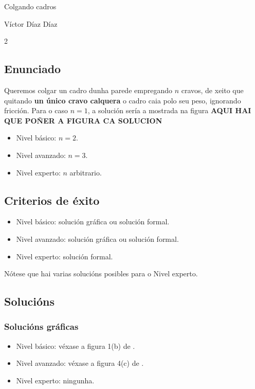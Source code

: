 Colgando cadros

Víctor Díaz Díaz

\begin{refsection}
\begin{multicols}{2}

\subsection{Enunciado}

Queremos colgar un cadro dunha parede empregando $n$ cravos, de xeito que
quitando \textbf{un único cravo calquera} o cadro caia polo seu peso, ignorando
fricción. Para o caso $n=1$, a solución sería a mostrada na figura \textbf{AQUI
HAI QUE POÑER A FIGURA CA SOLUCION}

\begin{itemize}
    \item[$\bullet$] Nivel básico: $n=2$.
    \item[$\bullet$] Nivel avanzado: $n=3$.
    \item[$\bullet$] Nivel experto: $n$ arbitrario.
\end{itemize}


\subsection{Criterios de éxito}

\begin{itemize}
    \item[$\bullet$] Nivel básico: solución gráfica ou solución formal.
    \item[$\bullet$] Nivel avanzado: solución gráfica ou solución formal.
    \item[$\bullet$] Nivel experto: solución formal.
\end{itemize}

Nótese que hai varias solucións posibles para o Nivel experto.

\subsection{Solucións}

\subsubsection{Solucións gráficas}

\begin{itemize}
    \item[$\bullet$] Nivel básico: véxase a figura 1(b) de \cite{demaine.ed.demaine.ml.minsky.yn.etal_2013}.
    \item[$\bullet$] Nivel avanzado: véxase a figura 4(c) de \cite{demaine.ed.demaine.ml.minsky.yn.etal_2013}.
    \item[$\bullet$] Nivel experto: ningunha.
\end{itemize}


\end{multicols}
\end{refsection}
